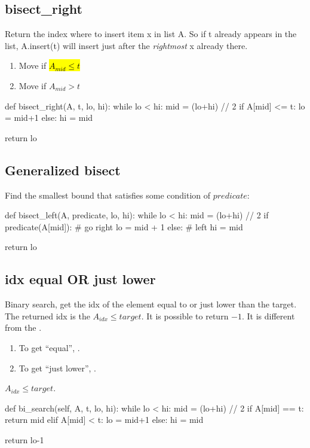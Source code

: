 \subsection{bisect\_right}
Return the index where to insert item x in list A. So if t already appears in the list, A.insert(t) will insert just after the \textit{rightmost} x already there.
\begin{enumerate}
\item Move  if \hl{$A_{mid} \leq t$}
\item Move  if $A_{mid} > t$
\end{enumerate}
\begin{python}
def bisect_right(A, t, lo, hi):
    while lo < hi:
        mid = (lo+hi) // 2
        if A[mid] <= t: 
            lo = mid+1
        else:
            hi = mid 

    return lo
\end{python}
\subsection{Generalized bisect}
Find the smallest bound that satisfies some condition of $predicate$:
\begin{python}
def bisect_left(A, predicate, lo, hi):
    while lo < hi:
        mid = (lo+hi) // 2
        if predicate(A[mid]):  # go right
            lo = mid + 1
        else:  # left
            hi = mid

    return lo
\end{python}

\subsection{idx equal OR just lower}
Binary search, get the idx of the element equal to or just lower than the target. The returned idx is the $A_{idx} \leq target$. It is possible to return $-1$. It is different from the .

\begin{enumerate}
\item To get ``equal'', .
\item To get ``just lower'', .
\end{enumerate}
$A_{idx} \leq target$.
\begin{python}
def bi_search(self, A, t, lo, hi):
    while lo < hi:
        mid = (lo+hi) // 2
        if A[mid] == t:
            return mid
        elif A[mid] < t:
            lo = mid+1
        else:
            hi = mid

    return lo-1
\end{python}

